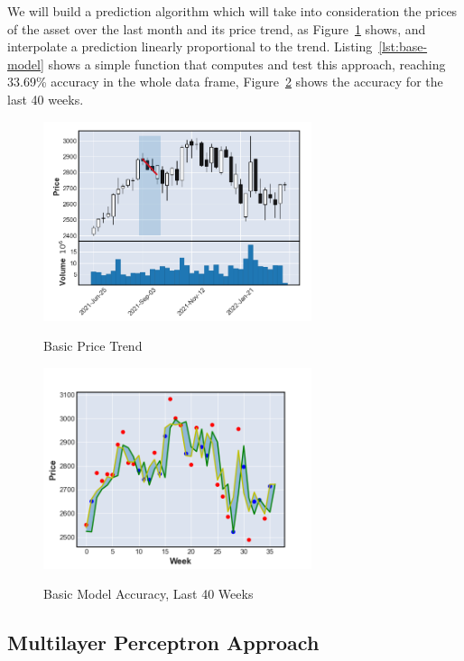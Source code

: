 We will build a prediction algorithm which will take into consideration the prices of the asset over the last month and its price trend, as Figure~\ref{fig:price-trend} shows, and interpolate a prediction linearly proportional to the trend. Listing~\ref{lst:base-model} shows a simple function that computes and test this approach, reaching 33.69\% accuracy in the whole data frame, Figure~\ref{fig:basic-acurracy} shows the accuracy for the last 40 weeks.

\begin{figure}[H]
    \centering
    \caption{Basic Price Trend}
    \includegraphics[width=0.7\textwidth]{figures/baselineCalc.png}
    \label{fig:price-trend}
\end{figure}

\begin{figure}[H]
    \centering
    \caption{Basic Model Accuracy, Last 40 Weeks}
    \includegraphics[width=0.7\textwidth]{figures/simple.png}
    \label{fig:basic-acurracy}
\end{figure}

\subsection{Multilayer Perceptron Approach}

